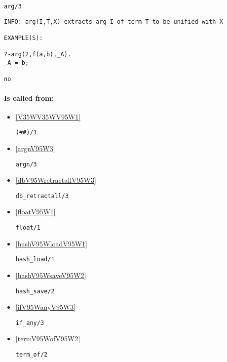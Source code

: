 \begin{verbatim}
arg/3
\end{verbatim}

{\small \begin{verbatim}
INFO: arg(I,T,X) extracts arg I of term T to be unified with X

EXAMPLE(S):

?-arg(2,f(a,b),_A).
_A = b;

no

\end{verbatim}}
\paragraph{Is called from:} 
\begin{itemize}
\item \ref{V35WV35WV95W1} 
\begin{verbatim}
(##)/1
\end{verbatim}

\item \ref{argnV95W3} 
\begin{verbatim}
argn/3
\end{verbatim}

\item \ref{dbV95WretractallV95W3} 
\begin{verbatim}
db_retractall/3
\end{verbatim}

\item \ref{floatV95W1} 
\begin{verbatim}
float/1
\end{verbatim}

\item \ref{hashV95WloadV95W1} 
\begin{verbatim}
hash_load/1
\end{verbatim}

\item \ref{hashV95WsaveV95W2} 
\begin{verbatim}
hash_save/2
\end{verbatim}

\item \ref{ifV95WanyV95W3} 
\begin{verbatim}
if_any/3
\end{verbatim}

\item \ref{termV95WofV95W2} 
\begin{verbatim}
term_of/2
\end{verbatim}

\end{itemize}

